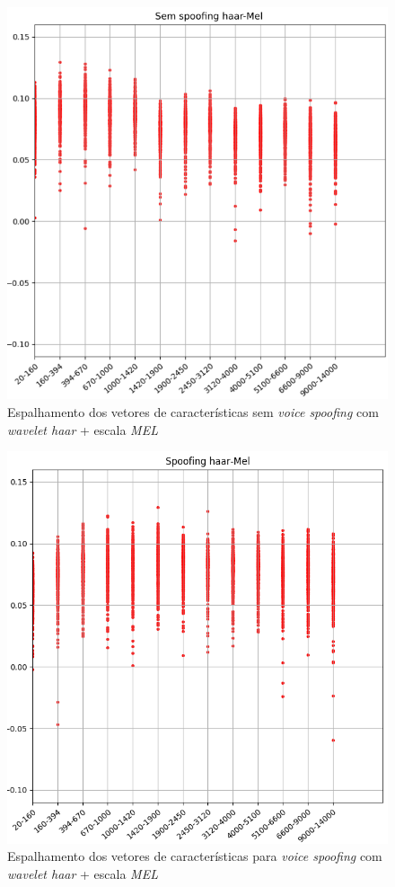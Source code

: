 		\begin{figure}[!h]
			\centering
			\includegraphics[width=.70\linewidth, height=.68\linewidth]{images/results/barkVersusMel/liveHaarMel}
			\caption{Espalhamento dos vetores de características sem \textit{voice spoofing} com \textit{wavelet haar} + escala \textit{MEL} }
			\label{fig:livehaarmel}
		\end{figure}
		\begin{figure}[!h]
			\centering
			\includegraphics[width=.70\linewidth, height=.68\linewidth]{images/results/barkVersusMel/spoofingHaarMel}
			\caption{Espalhamento dos vetores de características para \textit{voice spoofing} com \textit{wavelet haar} + escala \textit{MEL} }
			\label{fig:spoofinghaarmel}
		\end{figure}
